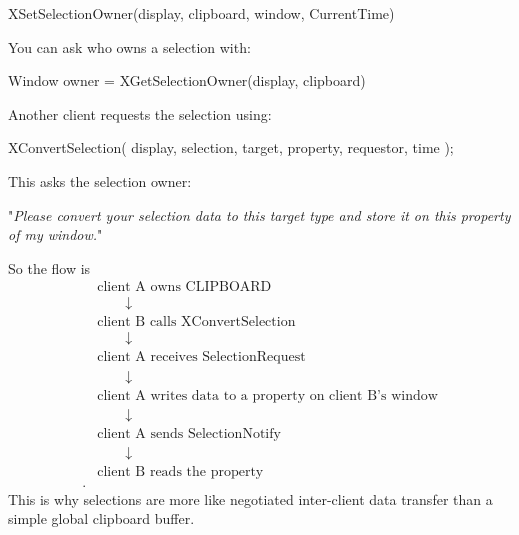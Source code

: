 \documentclass{report}
\begin{document}
\begin{itemize}
            \begin{cppcode}
                XSetSelectionOwner(display, clipboard, window, CurrentTime)
            \end{cppcode}
            \bigbreak \noindent 
            You can ask who owns a selection with:
            \bigbreak \noindent
            \begin{cppcode}
            Window owner = XGetSelectionOwner(display, clipboard) 
            \end{cppcode}
            \bigbreak \noindent 
            Another client requests the selection using:
            \bigbreak \noindent 
            \begin{cppcode}
                XConvertSelection(
                    display,
                    selection,
                    target,
                    property,
                    requestor,
                    time
                );
            \end{cppcode}
            \bigbreak \noindent 
            This asks the selection owner:
            \begin{center}
                "\textit{Please convert your selection data to this target type and store it on this property of my window.}"
            \end{center}
            So the flow is
            \begin{align*}
                &\text{client A owns CLIPBOARD} \\
                &\qquad\downarrow \\
                &\text{client B calls XConvertSelection }\\
                &\qquad\downarrow \\
                &\text{client A receives SelectionRequest }\\
                &\qquad\downarrow\\
                &\text{client A writes data to a property on client B's window}\\
                &\qquad\downarrow\\
                &\text{client A sends SelectionNotify}\\
                &\qquad\downarrow\\
                &\text{client B reads the property}\\
            .\end{align*}
            This is why selections are more like negotiated inter-client data transfer than a simple global clipboard buffer.

\end{itemize}
\end{document}
